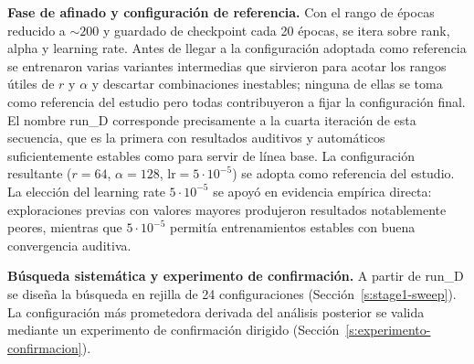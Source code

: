 \documentclass[%
    school=etsisi,%
    type=pfg,%
    degree=61CD,%
]{upm-report}
\begin{document}
\textbf{Fase de afinado y configuraci\'on de referencia.} Con el rango de \'epocas reducido a ${\sim}200$ y guardado de checkpoint cada 20 \'epocas, se itera sobre rank, alpha y learning rate. Antes de llegar a la configuraci\'on adoptada como referencia se entrenaron varias variantes intermedias que sirvieron para acotar los rangos \'utiles de $r$ y $\alpha$ y descartar combinaciones inestables; ninguna de ellas se toma como referencia del estudio pero todas contribuyeron a fijar la configuraci\'on final. El nombre run\_D corresponde precisamente a la cuarta iteraci\'on de esta secuencia, que es la primera con resultados auditivos y autom\'aticos suficientemente estables como para servir de l\'inea base. La configuraci\'on resultante ($r=64$, $\alpha=128$, $\text{lr}=5\cdot10^{-5}$) se adopta como referencia del estudio. La elecci\'on del learning rate $5\cdot10^{-5}$ se apoy\'o en evidencia emp\'irica directa: exploraciones previas con valores mayores produjeron resultados notablemente peores, mientras que $5\cdot10^{-5}$ permit\'ia entrenamientos estables con buena convergencia auditiva.

\textbf{B\'usqueda sistem\'atica y experimento de confirmaci\'on.} A partir de run\_D se dise\~na la b\'usqueda en rejilla de 24 configuraciones (Secci\'on~\ref{s:stage1-sweep}). La configuraci\'on m\'as prometedora derivada del an\'alisis posterior se valida mediante un experimento de confirmaci\'on dirigido (Secci\'on~\ref{s:experimento-confirmacion}).
\end{document}
